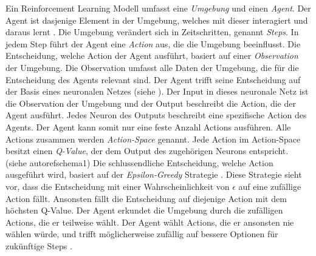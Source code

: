 Ein Reinforcement Learning Modell umfasst eine \emph{Umgebung} und einen
\emph{Agent}. Der Agent ist dasjenige Element in der Umgebung, welches mit
dieser interagiert und daraus lernt \cite[S. 53]{sutton_reinforcement_2014}. Die
Umgebung verändert sich in Zeitschritten, genannt \emph{Steps}. In jedem Step
führt der Agent eine \emph{Action} aus, die die Umgebung beeinflusst. Die
Entscheidung, welche Action der Agent ausführt, basiert auf einer
\emph{Observation} \cite[S. 2]{mnih_playing_2013} der Umgebung. Die
Observation umfasst alle Daten der Umgebung, die für die Entscheidung des Agents
relevant sind. Der Agent trifft seine Entscheidung auf der Basis eines
neuronalen Netzes (siehe ). Der Input in dieses neuronale
Netz ist die Observation der Umgebung und der Output beschreibt die Action, die
der Agent ausführt. Jedes Neuron des Outputs beschreibt eine spezifische Action
des Agents. Der Agent kann somit nur eine feste Anzahl Actions ausführen. Alle
Actions zusammen werden \emph{Action-Space} \cite[S.
67]{sutton_reinforcement_2014} genannt. Jede Action im Action-Space besitzt
einen \emph{Q-Value}, der dem Output des zugehörigen Neurons entspricht. (siehe
autoref{schema1}) \cite{wang_deep_2021} Die schlussendliche Entscheidung, welche
Action ausgeführt wird, basiert auf der \emph{Epsilon-Greedy} Strategie \cite[S.
34]{sutton_reinforcement_2014}. Diese Strategie sieht vor, dass die Entscheidung
mit einer Wahrscheinlichkeit von $\epsilon$ auf eine zufällige Action fällt.
Ansonsten fällt die Entscheidung auf diejenige Action mit dem höchsten Q-Value.
Der Agent erkundet die Umgebung durch die zufälligen Actions, die er teilweise
wählt. Der Agent wählt Actions, die er ansonsten nie wählen würde, und trifft
möglicherweise zufällig auf bessere Optionen für zukünftige Steps
\cite{rajendra_koppula_exploration_nodate}.


